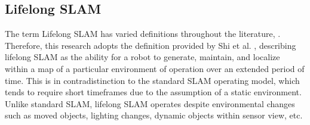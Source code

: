 \subsection{Lifelong SLAM}

The term Lifelong SLAM has varied definitions throughout the literature, . Therefore, this research adopts the definition provided by Shi et al. \cite{shiAreWeReady2020}, describing lifelong SLAM as the ability for a robot to generate, maintain, and localize within a map of a particular environment of operation over an extended period of time. This is in contradistinction to the standard SLAM operating model, which tends to require short timeframes due to the assumption of a static environment. Unlike standard SLAM, lifelong SLAM operates despite environmental changes such as moved objects, lighting changes, dynamic objects within sensor view, etc. 